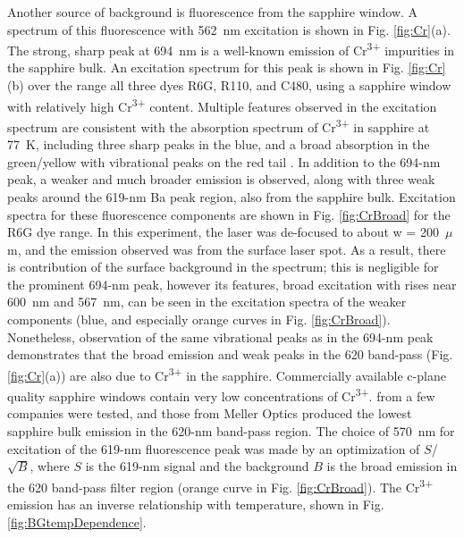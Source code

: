 Another source of background is fluorescence from the sapphire window.  A spectrum of this fluorescence with 562~nm excitation is shown in Fig. \ref{fig:Cr}(a).  The strong, sharp peak at 694~nm is a well-known emission of Cr\textsuperscript{3+} impurities in the sapphire bulk.  An excitation spectrum for this peak is shown in Fig. \ref{fig:Cr}(b) over the range all three dyes R6G, R110, and C480, using a sapphire window with relatively high Cr\textsuperscript{3+} content.  Multiple features observed in the excitation spectrum are consistent with the absorption spectrum of Cr\textsuperscript{3+} in sapphire at 77~K, including three sharp peaks in the blue, and a broad absorption in the green/yellow with vibrational peaks on the red tail \cite{SapphireFord,SapphireMcclure}.  In addition to the 694-nm peak, a weaker and much broader emission is observed, along with three weak peaks around the 619-nm Ba peak region, also from the sapphire bulk.  Excitation spectra for these fluorescence components are shown in Fig. \ref{fig:CrBroad} for the R6G dye range.  In this experiment, the laser was de-focused to about w = 200~$\mu$m, and the emission observed was from the surface laser spot.  As a result, there is contribution of the surface background in the spectrum; this is negligible for the prominent 694-nm peak, however its features, broad excitation with rises near 600~nm and 567~nm, can be seen in the excitation spectra of the weaker components (blue, and especially orange curves in Fig. \ref{fig:CrBroad}).  Nonetheless, observation of the same vibrational peaks as in the 694-nm peak demonstrates that the broad emission and weak peaks in the 620 band-pass (Fig. \ref{fig:Cr}(a)) are also due to Cr\textsuperscript{3+} in the sapphire.  Commercially available c-plane quality sapphire windows contain very low concentrations of Cr\textsuperscript{3+}.   from a few companies were tested, and those from Meller Optics produced the lowest sapphire bulk emission in the 620-nm band-pass region.  The choice of 570~nm for excitation of the 619-nm fluorescence peak was made by an optimization of $S$/$\sqrt{B}$, where $S$ is the 619-nm signal and the background $B$ is the broad emission in the 620 band-pass filter region (orange curve in Fig. \ref{fig:CrBroad}).  The Cr\textsuperscript{3+} emission has an inverse relationship with temperature, shown in Fig. \ref{fig:BGtempDependence}.


